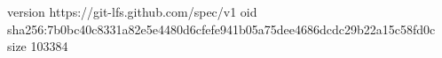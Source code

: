 version https://git-lfs.github.com/spec/v1
oid sha256:7b0bc40c8331a82e5e4480d6cfefe941b05a75dee4686dcdc29b22a15c58fd0c
size 103384
